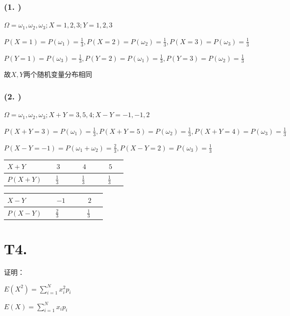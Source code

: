 \documentclass{article}
\newcommand\f[2]{\frac{#1}{#2}}
\begin{document}
\subsubsection*{(1. )}

$\Omega=\omega_1,\omega_2,\omega_3;X=1,2,3;Y=1,2,3$

$P(X=1)=P(\omega_1)=\f{1}{3},P(X=2)=P(\omega_2)=\f{1}{3},P(X=3)=P(\omega_3)=\f{1}{3}$

$P(Y=1)=P(\omega_3)=\f{1}{3},P(Y=2)=P(\omega_1)=\f{1}{3},P(Y=3)=P(\omega_2)=\f{1}{3}$

故$X,Y$两个随机变量分布相同

\subsubsection*{(2. )}

$\Omega=\omega_1,\omega_2,\omega_3;X+Y=3,5,4;X-Y=-1,-1,2$

$P(X+Y=3)=P(\omega_1)=\f{1}{3},P(X+Y=5)=P(\omega_2)=\f{1}{3},P(X+Y=4)=P(\omega_3)=\f{1}{3}$

$P(X-Y=-1)=P(\omega_1+\omega_2)=\f{2}{3},P(X-Y=2)=P(\omega_3)=\f{1}{3}$

\begin{table}[H]
    \centering
    \begin{tabular}{|l|l|l|l|}
        \hline
        $X+Y$ & ~~$3$~~ & ~~$4$~~ & ~~$5$~~ \\ \hline
        $P(X+Y)$ & ~~$\f{1}{3}$ & ~~$\f{1}{3}$ & ~~$\f{1}{3}$ \\ \hline
    \end{tabular}
\end{table}

\begin{table}[H]
    \centering
    \begin{tabular}{|l|l|l|}
        \hline
        $X-Y$ & ~~$-1$~~ & ~~$2$~~ \\ \hline
        $P(X-Y)$ & ~~$\f{2}{3}$ & ~~$\f{1}{3}$ \\ \hline
    \end{tabular}
\end{table}

\section*{T4. }

证明：

$E(X^2)=\sum_{i=1}^{N}x_i^2p_i$

$E(X)=\sum_{i=1}^{N}x_ip_i$
\end{document}
